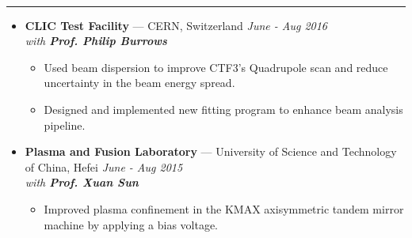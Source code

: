 \documentclass[11 pt,oneside]{article}
\newenvironment{ressection}[1]{
	\vspace{4pt}
	{\selectfont\Large\color{Mycolor2}{\textbf{#1}}}
	\vspace{-6.5pt} \\
	\textcolor{Mycolor2}{\rule{\textwidth}{0.7pt}}
	\begin{itemize}
	\vspace{3pt}
}{
	\end{itemize}
}
\newcommand{\ressubitem}{
	\vspace{-4pt}
	\item
}
\newcommand{\resbigitem}[3]{
	\vspace{-5pt}
	\item[]
	\textbf{#1} --- #2 %
	\hfill
	\textit{#3}
}
\newenvironment{ressubsec}[3]{
	\resbigitem{#1}{#2}{#3}
	\vspace{-2pt}
	\begin{itemize}
}{
	\end{itemize}
}
\begin{document}
\begin{ressection}{\textbf{Research}}
	\vspace{2pt}

	\begin{ressubsec}{CLIC Test Facility}{CERN, Switzerland}{June - Aug 2016 \\ with \textbf{Prof. Philip Burrows}}
		\ressubitem{Used beam dispersion to improve CTF3's Quadrupole scan and reduce uncertainty in the beam energy spread.}
		\ressubitem{Designed and implemented new fitting program to enhance beam analysis pipeline.}
	\end{ressubsec}

	\vspace{2pt}

	\begin{ressubsec}{Plasma and Fusion Laboratory}{University of Science and Technology of China, Hefei}{June - Aug 2015\\ with \textbf{Prof. Xuan Sun}}
		\ressubitem{Improved plasma confinement in the KMAX axisymmetric tandem mirror machine by applying a bias voltage.}
	\end{ressubsec}

\end{ressection}
\end{document}

